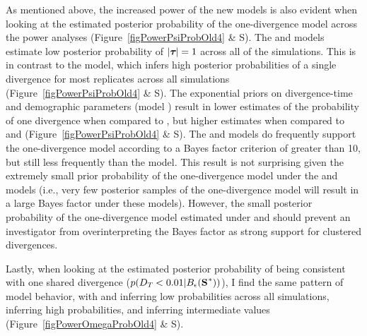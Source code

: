 As mentioned above, the increased power of the new models is also evident when
looking at the estimated posterior probability of the one-divergence model
across the power analyses 
(Figure~\ref{figPowerPsiProbOld4} \& 
S).
The \modelDPP and \modelUniform models estimate low posterior probability of
$\lvert \boldsymbol{\tau_{}} \rvert = 1$ across all of the simulations.
This is in contrast to the \modelOld model, which infers high posterior probabilities of a single
divergence for most replicates across all simulations
(Figure~\ref{figPowerPsiProbOld4} \& 
S).
The exponential priors on divergence-time and demographic parameters (model
\modelUshaped) result in lower estimates of the probability of one divergence
when compared to \modelOld, but higher estimates when compared to \modelUniform
and \modelDPP
(Figure~\ref{figPowerPsiProbOld4} \& 
S).
The \modelDPP and \modelUniform models do frequently support the one-divergence
model according to a Bayes factor criterion of greater than 10, but still
less frequently than the \modelOld model.
This result is not surprising given the extremely small prior probability of
the one-divergence model under the \modelDPP and \modelUniform models (i.e.,
very few posterior samples of the one-divergence model will result in a
large Bayes factor under these models).
However, the small posterior probability of the one-divergence model estimated
under \modelDPP and \modelUniform should prevent an investigator from
overinterpreting the Bayes factor as strong support for clustered divergences.

Lastly, when looking at the estimated posterior probability of
\divTimeDispersion being consistent with one shared divergence
($p(\divTimeDispersion < 0.01 | \ssSpace)$), I find the same pattern of model
behavior, with \modelDPP and \modelUniform inferring low probabilities across
all simulations, \modelOld inferring high probabilities, and \modelUshaped
inferring intermediate values
(Figure~\ref{figPowerOmegaProbOld4} \& 
S).

